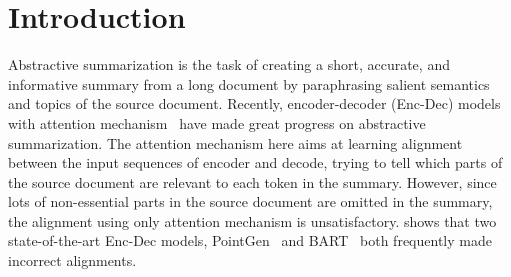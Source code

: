 \section{Introduction}
\label{sec:intro}

Abstractive summarization is the task of creating a short, accurate,
and informative summary from a long document
by paraphrasing salient semantics and topics of the source document. 
Recently, encoder-decoder (Enc-Dec) 
models with attention mechanism~\cite{NallapatiZSGX16,SeeLM17,CelikyilmazBHC18,UniLM19}
have made great progress on abstractive summarization.
The attention mechanism here aims at learning alignment 
between the input sequences of encoder and decode, trying to tell which parts of the source document are relevant to each token in the summary.
However, since lots of non-essential parts in the source document are omitted in the summary, the alignment using only attention mechanism is unsatisfactory. 
 shows that two state-of-the-art Enc-Dec models, 
PointGen~\cite{SeeLM17} and BART~\cite{BART19} both frequently made 
incorrect alignments.

